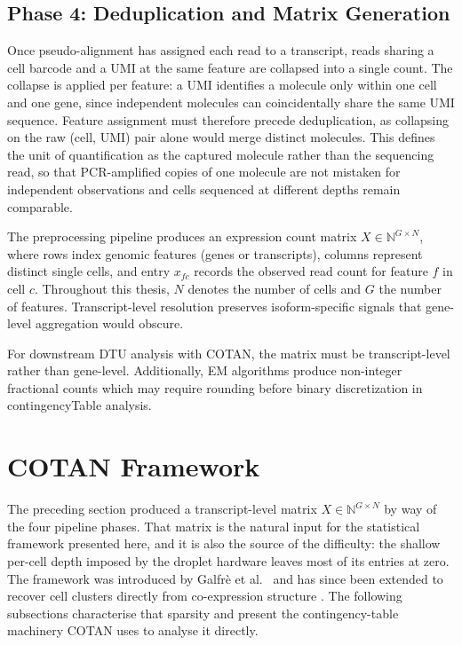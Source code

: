 \subsection{Phase 4: Deduplication and Matrix Generation}
Once pseudo-alignment has assigned each read to a transcript, reads sharing a cell barcode and a UMI at the same feature are collapsed into a single count. The collapse is applied per feature: a UMI identifies a molecule only within one cell and one gene, since independent molecules can coincidentally share the same UMI sequence. Feature assignment must therefore precede deduplication, as collapsing on the raw (cell, UMI) pair alone would merge distinct molecules. This defines the unit of quantification as the captured molecule rather than the sequencing read, so that PCR-amplified copies of one molecule are not mistaken for independent observations and cells sequenced at different depths remain comparable.

The preprocessing pipeline produces an expression count matrix $X \in \mathbb{N}^{G \times N}$, where rows index genomic features (genes or transcripts), columns represent distinct single cells, and entry $x_{fc}$ records the observed read count for feature $f$ in cell $c$. Throughout this thesis, $N$ denotes the number of cells and $G$ the number of features. Transcript-level resolution preserves isoform-specific signals that gene-level aggregation would obscure.


For downstream DTU analysis with COTAN, the matrix must be transcript-level rather than gene-level. Additionally, EM algorithms produce non-integer fractional counts which may require rounding before binary discretization in \gls{contingencyTable} analysis.

\section{COTAN Framework}

The preceding section produced a transcript-level matrix $X \in \mathbb{N}^{G \times N}$ by way of the four pipeline phases. That matrix is the natural input for the statistical framework presented here, and it is also the source of the difficulty: the shallow per-cell depth imposed by the droplet hardware leaves most of its entries at zero. The framework was introduced by Galfr\`e et al.\ \cite{galfre2021cotan} and has since been extended to recover cell clusters directly from co-expression structure \cite{galfre2026gene}. The following subsections characterise that sparsity and present the contingency-table machinery COTAN uses to analyse it directly.

